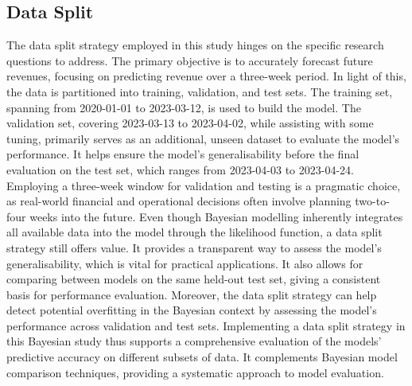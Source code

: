 \subsection{Data Split}
The data split strategy employed in this study hinges on the specific research
questions to address. The primary objective is to accurately forecast
future revenues, focusing on predicting revenue over a three-week period. In
light of this, the data is partitioned into training, validation, and test
sets.
The training set, spanning from 2020-01-01 to 2023-03-12, is used to build the
model. The validation set, covering 2023-03-13 to 2023-04-02, while assisting
with some tuning, primarily serves as an additional, unseen dataset to evaluate
the model's performance. It helps ensure the model's generalisability before
the final evaluation on the test set, which ranges from 2023-04-03 to
2023-04-24. 
Employing a three-week window for validation and testing is a pragmatic choice,
as real-world financial and operational decisions often involve planning
two-to-four weeks into the future.
Even though Bayesian modelling inherently integrates all available data into the model
through the likelihood function, a data split strategy still offers value. It
provides a transparent way to assess the model's generalisability, which is
vital for practical applications. It also allows for comparing between models
on the same held-out test set, giving a consistent basis for performance
evaluation. Moreover, the data split strategy can help detect potential
overfitting in the Bayesian context by assessing the model's performance across
validation and test sets.
Implementing a data split strategy in this Bayesian study thus supports a
comprehensive evaluation of the models’ predictive accuracy on different
subsets of data. It complements Bayesian model comparison techniques, providing
a systematic approach to model evaluation.
